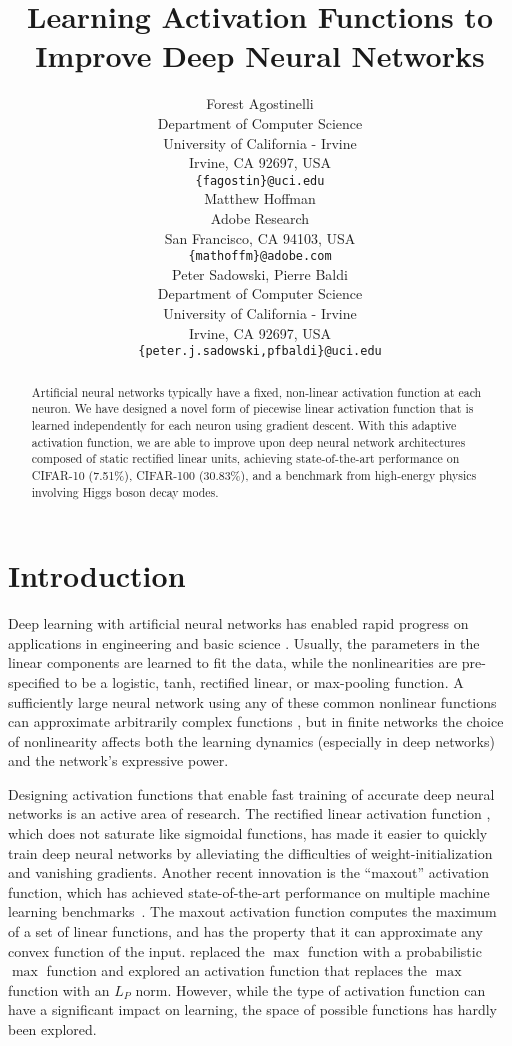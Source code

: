 \documentclass{article} \usepackage{iclr2015,times}
\title{Learning Activation Functions to Improve Deep Neural Networks}
\author{
Forest Agostinelli\\
Department of Computer Science\\
University of California - Irvine\\
Irvine, CA 92697, USA \\
\texttt{\{fagostin\}@uci.edu} \\
\And
Matthew Hoffman \\
Adobe Research \\
San Francisco, CA 94103, USA\\
\texttt{\{mathoffm\}@adobe.com} \\
\And
Peter Sadowski, Pierre Baldi\\
Department of Computer Science\\
University of California - Irvine\\
Irvine, CA 92697, USA \\
\texttt{\{peter.j.sadowski,pfbaldi\}@uci.edu} \\
}
\begin{document}
\maketitle

\begin{abstract}
Artificial neural networks typically have a fixed, non-linear activation function at each neuron. We have designed a novel form of piecewise linear activation function that is learned independently for each neuron using gradient descent. With this adaptive activation function, we are able to improve upon deep neural network architectures composed of static rectified linear units, achieving state-of-the-art performance on CIFAR-10 (7.51\%), CIFAR-100 (30.83\%), and a benchmark from high-energy physics involving Higgs boson decay modes.
\end{abstract}
 
\section{Introduction}

Deep learning with artificial neural networks has enabled rapid progress on applications in engineering \citep[e.g.,][]{krizhevsky2012imagenet, deepspeech} and basic science \citep[e.g.,][]{deepcontact2012, lusci2013deep, baldi2014searching}. Usually, the parameters in the linear components are learned to fit the data, while the nonlinearities are pre-specified to be a logistic, tanh, rectified linear, or max-pooling function.
A sufficiently large neural network using any of these common nonlinear functions can approximate arbitrarily complex functions \citep{hornik1989multilayer,cho2010arccos},
but in finite networks the choice of nonlinearity affects both the learning dynamics (especially in deep networks) and the network's expressive power.

Designing activation functions that enable fast training of accurate deep neural networks is an active area of research.
The rectified linear activation function \citep{jarrett2009best,glorot2011deep}, which does not saturate like sigmoidal functions, has made it easier to quickly train deep neural networks by alleviating the difficulties of weight-initialization and vanishing gradients. Another recent innovation is the ``maxout'' activation function, which has achieved state-of-the-art performance on multiple machine learning benchmarks~\citep{goodfellow2013maxout}. The maxout activation function computes the maximum of a set of linear functions, and has the property that it can approximate any convex function of the input. \citet{springenberg2013improving} replaced the $\max$ function with a probabilistic $\max$ function and \citet{gulcehre2014learned} explored an activation function that replaces the $\max$ function with an $L_P$ norm. However, while the type of activation function can have a significant impact on learning, the space of possible functions has hardly been explored.
\end{document}
